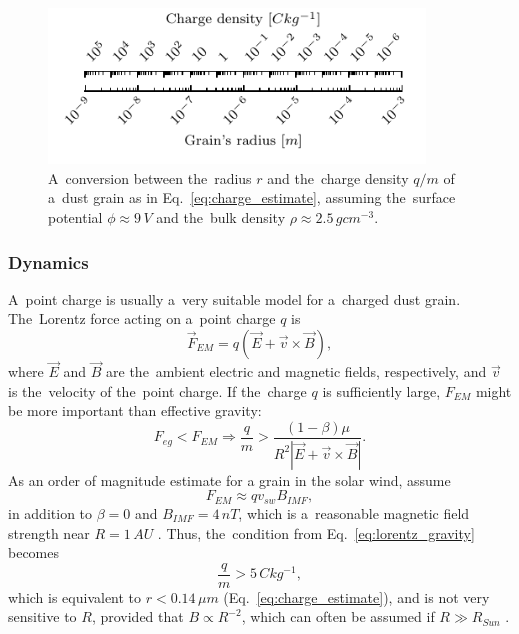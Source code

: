 \begin{figure}[ht]
 	\centering
 	\includegraphics[width=10cm]{figures/charge_density_ruler.pdf}
 	\caption{A~conversion between the~radius $r$ and the~charge density $q/m$ of a~dust grain as in Eq.~\ref{eq:charge_estimate}, assuming the~surface potential $\phi \approx 9 \, \si{V}$ and the~bulk density $\rho \approx 2.5 \, \si{g cm^{-3}}$.}
 	\label{fig:charge_density_ruler}
\end{figure}

\subsubsection{Dynamics}

A~point charge is usually a~very suitable model for a~charged dust grain. The~Lorentz force acting on a~point charge $q$ is
\begin{equation}
\vec{F}_{EM} = q \left( \vec{E} + \vec{v} \times \vec{B} \right),
\end{equation}
where $\vec{E}$ and $\vec{B}$ are the~ambient electric and magnetic fields, respectively, and $\vec{v}$ is the~velocity of the~point charge. If the~charge $q$ is sufficiently large, $F_{EM}$ might be more important than effective gravity:
\begin{equation}
    F_{eg} < F_{EM} \Rightarrow \frac{q}{m} > \frac{(1-\beta)\mu}{R^2 \left| \vec{E} + \vec{v} \times \vec{B} \right|}. \label{eq:lorentz_gravity}
\end{equation}
As an order of magnitude estimate for a grain in the solar wind, assume 
\begin{equation}
    F_{EM} \approx q v_{sw} B_{IMF},
    \label{eq:EM_estimate}
\end{equation}
in addition to $\beta = 0$ and $B_{IMF} = 4 \, \si{nT}$, which is a~reasonable magnetic field strength near $R = 1 \, \si{AU}$ \citep{mann2007nanoparticles}. Thus, the~condition from Eq.~\ref{eq:lorentz_gravity} becomes
\begin{equation}
    \frac{q}{m} > 5 \, \si{C kg^{-1}},
\end{equation}
which is equivalent to $r < 0.14 \, \si{\mu m}$ (Eq.~\ref{eq:charge_estimate}), and is not very sensitive to $R$, provided that $B \propto R^{-2}$, which can often be assumed if $R \gg R_{Sun}$ \citep{parker1958dynamics}.  

